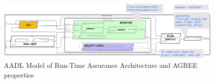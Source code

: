 \begin{figure}
	\centering
	\includegraphics[width=\textwidth]{figures/rta-agree.jpg}
	\caption{AADL Model of Run-Time Assurance Architecture and AGREE properties}
	\label{fig:rta-agree}
\end{figure}
